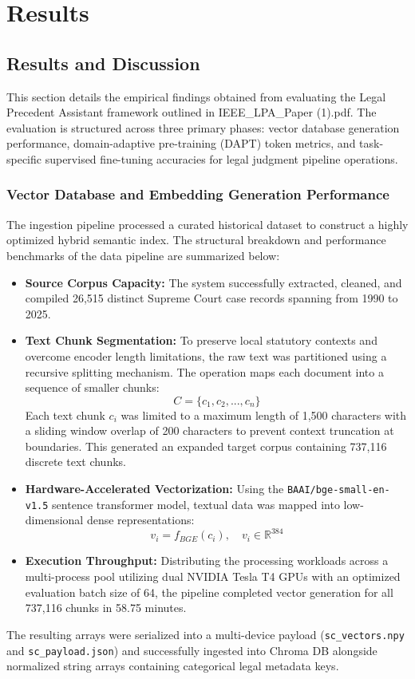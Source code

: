 \chapter{Results}
{\label{ch:results}}

\section{Results and Discussion}
This section details the empirical findings obtained from evaluating the Legal Precedent Assistant framework outlined in IEEE\_LPA\_Paper (1).pdf. The evaluation is structured across three primary phases: vector database generation performance, domain-adaptive pre-training (DAPT) token metrics, and task-specific supervised fine-tuning accuracies for legal judgment pipeline operations.

\subsection{Vector Database and Embedding Generation Performance}
The ingestion pipeline processed a curated historical dataset to construct a highly optimized hybrid semantic index. The structural breakdown and performance benchmarks of the data pipeline are summarized below:

\begin{itemize}
	\item \textbf{Source Corpus Capacity:} The system successfully extracted, cleaned, and compiled 26,515 distinct Supreme Court case records spanning from 1990 to 2025.
	\item \textbf{Text Chunk Segmentation:} To preserve local statutory contexts and overcome encoder length limitations, the raw text was partitioned using a recursive splitting mechanism. The operation maps each document into a sequence of smaller chunks:
	\begin{equation}
		C=\{c_{1},c_{2},...,c_{n}\} \text{}
	\end{equation}
	Each text chunk $c_i$ was limited to a maximum length of 1,500 characters with a sliding window overlap of 200 characters to prevent context truncation at boundaries. This generated an expanded target corpus containing 737,116 discrete text chunks.
	\item \textbf{Hardware-Accelerated Vectorization:} Using the \texttt{BAAI/bge-small-en-v1.5} sentence transformer model, textual data was mapped into low-dimensional dense representations:
	\begin{equation}
		v_{i}=f_{BGE}(c_{i}), \quad v_{i}\in\mathbb{R}^{384} \text{}
	\end{equation}
	\item \textbf{Execution Throughput:} Distributing the processing workloads across a multi-process pool utilizing dual NVIDIA Tesla T4 GPUs with an optimized evaluation batch size of 64, the pipeline completed vector generation for all 737,116 chunks in 58.75 minutes.
\end{itemize}
The resulting arrays were serialized into a multi-device payload (\texttt{sc\_vectors.npy} and \texttt{sc\_payload.json}) and successfully ingested into Chroma DB alongside normalized string arrays containing categorical legal metadata keys.

